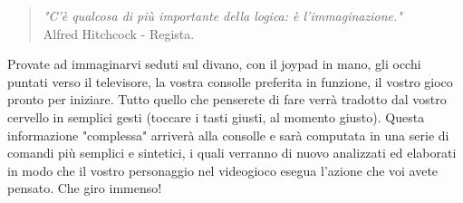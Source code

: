 \documentclass[12pt,fleqn,a4paper]{book} %
\begin{document}
    			\begin{quote}
    				\textit{"C'è qualcosa di più importante della logica: è l'immaginazione."}\\
    				Alfred Hitchcock - Regista.
    			\end{quote}
    		
    			Provate ad immaginarvi seduti sul divano, con il joypad in mano, gli occhi puntati verso il televisore, la vostra consolle preferita in funzione, il vostro gioco pronto per iniziare.
    			Tutto quello che penserete di fare verrà tradotto dal vostro cervello in semplici gesti (toccare i tasti giusti, al momento giusto). Questa informazione "complessa" arriverà alla consolle e sarà computata in una serie di comandi più semplici e sintetici, i quali verranno di nuovo analizzati ed elaborati in modo che il vostro personaggio nel videogioco esegua l'azione che voi avete pensato. Che giro immenso!
    			
\end{document}
